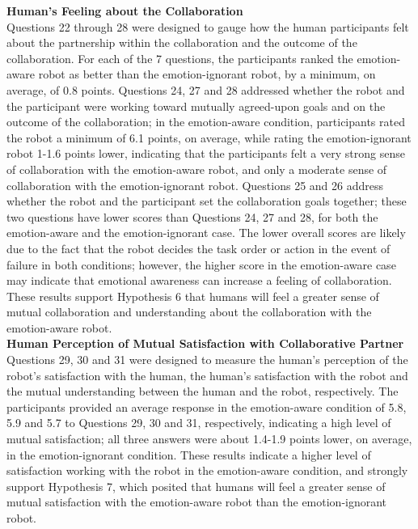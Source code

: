 \documentclass[12pt]{report}
\begin{document}
\hspace*{-8mm} \textbf{Human's Feeling about the Collaboration}
\label{sec:Collaboration}
\\Questions 22 through 28 were designed to gauge how the human participants
felt about the partnership within the collaboration and the outcome of the
collaboration. For each of the 7 questions, the participants ranked the
emotion-aware robot as better than the emotion-ignorant robot, by a minimum,
on average, of 0.8 points. Questions 24, 27 and 28 addressed whether the robot
and the participant were working toward mutually agreed-upon goals and on the
outcome of the collaboration; in the emotion-aware condition, participants rated
the robot a minimum of 6.1 points, on average, while rating the emotion-ignorant
robot 1-1.6 points lower, indicating that the participants felt a very strong
sense of collaboration with the emotion-aware robot, and only a moderate sense
of collaboration with the emotion-ignorant robot. Questions 25 and 26 address
whether the robot and the participant set the collaboration goals together;
these two questions have lower scores than Questions 24, 27 and 28, for both the
emotion-aware and the emotion-ignorant case. The lower overall scores are
likely due to the fact that the robot decides the task order or action in the
event of failure in both conditions; however, the higher score in the
emotion-aware case may indicate that emotional awareness can increase a feeling
of collaboration. These results support Hypothesis 6 that humans will feel
a greater sense of mutual collaboration and understanding about the
collaboration with the emotion-aware robot.\\

\hspace*{-8mm} \textbf{Human Perception of Mutual Satisfaction with
Collaborative Partner}
\label{sec:MutualSatisfaction}
\\ Questions 29, 30 and 31 were designed to measure the human's perception
of the robot's satisfaction with the human, the human's satisfaction with the
robot and the mutual understanding between the human and the robot,
respectively. The participants provided an average response in the emotion-aware
condition of 5.8, 5.9 and 5.7 to Questions 29, 30 and 31, respectively,
indicating a high level of mutual satisfaction; all three answers were
about 1.4-1.9 points lower, on average, in the emotion-ignorant condition. These
results indicate a higher level of satisfaction working with the robot in the
emotion-aware condition, and strongly support Hypothesis 7, which posited that
humans will feel a greater sense of mutual satisfaction with the emotion-aware
robot than the emotion-ignorant robot.
\end{document}
